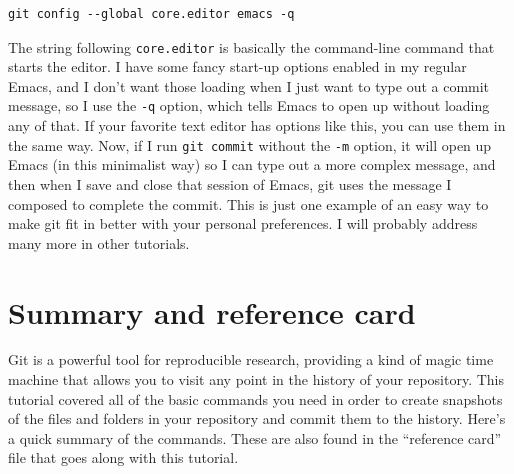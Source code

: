 \documentclass[11pt]{article}
\begin{document}
\begin{verbatim}
git config --global core.editor emacs -q
\end{verbatim}

The string following \texttt{core.editor} is basically the command-line command that starts the editor. I have some fancy start-up options enabled in my regular Emacs, and I don't want those loading when I just want to type out a commit message, so I use the \texttt{-q} option, which tells Emacs to open up without loading any of that.  If your favorite text editor has options like this, you can use them in the same way.  Now, if I run \texttt{git commit} without the \texttt{-m} option, it will open up Emacs (in this minimalist way) so I can type out a more complex message, and then when I save and close that session of Emacs, git uses the message I composed to complete the commit.  This is just one example of an easy way to make git fit in better with your personal preferences. I will probably address many more in other tutorials.
\section{Summary and reference card}
\label{sec-11}

Git is a powerful tool for reproducible research, providing a kind of magic time machine that allows you to visit any point in the history of your repository. This tutorial covered all of the basic commands you need in order to create snapshots of the files and folders in your repository and commit them to the history. Here's a quick summary of the commands. These are also found in the ``reference card'' file that goes along with this tutorial.
\end{document}
